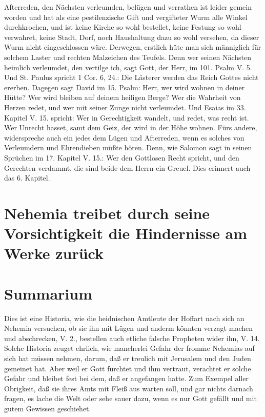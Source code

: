 Afterreden, den Nächsten verleumden, belügen und verrathen ist leider gemein worden und hat als eine pestilenzische Gift und vergifteter Wurm alle Winkel durchkrochen, und ist keine Kirche so wohl bestellet, keine Festung so wohl verwahret, keine Stadt, Dorf, noch Haushaltung dazu so wohl versehen, da dieser Wurm nicht eingeschlossen wäre. Derwegen, erstlich hüte man sich männiglich für solchem Laster und rechten Malzeichen des Teufels. Denn wer seinen Nächsten heimlich verleumdet, den vertilge ich, sagt Gott, der Herr, im 101. Psalm V. 5. Und St. Paulus spricht 1 Cor. 6, 24.: Die Lästerer werden das Reich Gottes nicht ererben. Dagegen sagt David im 15. Psalm: Herr, wer wird wohnen in deiner Hütte? Wer wird bleiben auf deinem heiligen Berge? Wer die Wahrheit von Herzen redet, und wer mit seiner Zunge nicht verleumdet. Und Esaias im 33. Kapitel V. 15. spricht: Wer in Gerechtigkeit wandelt, und redet, was recht ist. Wer Unrecht hasset, samt dem Geiz, der wird in der Höhe wohnen. Fürs andere, widerspreche auch ein jedes dem Lügen und Afterreden, wenn es solches von Verleumdern und Ehrendieben müßte hören. Denn, wie Salomon sagt in seinen Sprüchen im 17. Kapitel V. 15.: Wer den Gottlosen Recht spricht, und den Gerechten verdammt, die sind beide dem Herrn ein Greuel. Dies erinnert auch das 6. Kapitel.

\section[Nehemia treibet durch seine Vorsichtigkeit die Hindernisse am]{Nehemia treibet durch seine Vorsichtigkeit die Hindernisse am Werke zurück}


\section{Summarium}

Dies ist eine Historia, wie die heidnischen Amtleute der Hoffart nach sich an Nehemia versuchen, ob sie ihn mit Lügen und anderm könnten verzagt machen und abschrecken, V. 2., bestellen auch etliche falsche Propheten wider ihn, V. 14. Solche Historia zeuget ehrlich, wie mancherlei Gefahr der fromme Nehemias auf sich hat müssen nehmen, darum, daß er treulich mit Jerusalem und den Juden gemeinet hat. Aber weil er Gott fürchtet und ihm vertraut, verachtet er solche Gefahr und bleibet fest bei dem, daß er angefangen hatte. Zum Exempel aller Obrigkeit, daß sie ihres Amts mit Fleiß aus warten soll, und gar nichts darnach fragen, es lache die Welt oder sehe sauer dazu, wenn es nur Gott gefällt und mit gutem Gewissen geschiehet.

